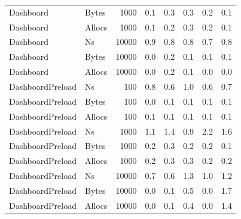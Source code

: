 \begin{table}[ht]
\begin{tabular}{llrrrrrr}
	Dashboard & Bytes & 1000 &  0.1 &  0.3 &  0.3 &  0.2 &  0.1 \\
	Dashboard & Allocs & 1000 &  0.1 &  0.2 &  0.3 &  0.2 &  0.1 \\
	Dashboard & Ns & 10000 &  0.9 &  0.8 &  0.8 &  0.7 &  0.8 \\
	Dashboard & Bytes & 10000 &  0.0 &  0.2 &  0.1 &  0.1 &  0.1 \\
	Dashboard & Allocs & 10000 &  0.0 &  0.2 &  0.1 &  0.0 &  0.0 \\
	DashboardPreload & Ns & 100 &  0.8 &  0.6 &  1.0 &  0.6 &  0.7 \\
	DashboardPreload & Bytes & 100 &  0.0 &  0.1 &  0.1 &  0.1 &  0.1 \\
	DashboardPreload & Allocs & 100 &  0.1 &  0.1 &  0.1 &  0.1 &  0.1 \\
	DashboardPreload & Ns & 1000 &  1.1 &  1.4 &  0.9 & \cellcolor{red!11}  2.2 &  1.6 \\
	DashboardPreload & Bytes & 1000 &  0.2 &  0.3 &  0.2 &  0.2 &  0.1 \\
	DashboardPreload & Allocs & 1000 &  0.2 &  0.3 &  0.3 &  0.2 &  0.2 \\
	DashboardPreload & Ns & 10000 &  0.7 &  0.6 &  1.3 &  1.0 &  1.2 \\
	DashboardPreload & Bytes & 10000 &  0.0 &  0.1 &  0.5 &  0.0 &  1.7 \\
	DashboardPreload & Allocs & 10000 &  0.0 &  0.1 &  0.4 &  0.0 &  1.4 \\
\bottomrule
\end{tabular}
\label{tab:variationskoeffizienten_sqlt}
\end{table}
	
